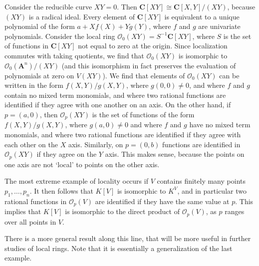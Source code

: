 \begin{example}
    Consider the reducible curve $XY = 0$. Then $\mathbf{C}[XY] \cong \mathbf{C}[X,Y]/(XY)$, because $(XY)$ is a radical ideal. Every element of $\mathbf{C}[XY]$ is equivalent to a unique polynomial of the form $a + Xf(X) + Yg(Y)$, where $f$ and $g$ are univariate polynomials. Consider the local ring $\mathcal{O}_0(XY) = S^{-1}\mathbf{C}[XY]$, where $S$ is the set of functions in $\mathbf{C}[XY]$ not equal to zero at the origin. Since localization commutes with taking quotients, we find that $\mathcal{O}_0(XY)$ is isomorphic to $\mathcal{O}_0(\mathbf{A}^n)/(XY)$ (and this isomorphism in fact preserves the evaluation of polynomials at zero on $V(XY)$). We find that elements of $\mathcal{O}_0(XY)$ can be written in the form $f(X,Y)/g(X,Y)$, where $g(0,0) \neq 0$, and where $f$ and $g$ contain no mixed term monomials, and where two rational functions are identified if they agree with one another on an axis. On the other hand, if $p = (a,0)$, then $\mathcal{O}_p(XY)$ is the set of functions of the form $f(X,Y)/g(X,Y)$, where $g(a,0) \neq 0$ and where $f$ and $g$ have no mixed term monomials, and where two rational functions are identified if they agree with each other on the $X$ axis. Similarly, on $p = (0,b)$ functions are identified in $\mathcal{O}_p(XY)$ if they agree on the $Y$ axis. This makes sense, because the points on one axis are not `local' to points on the other axis.
\end{example}

\begin{example}
    The most extreme example of locality occurs if $V$ contains finitely many points $p_1, \dots, p_n$. It then follows that $K[V]$ is isomorphic to $K^V$, and in particular two rational functions in $\mathcal{O}_p(V)$ are identified if they have the same value at $p$. This implies that $K[V]$ is isomorphic to the direct product of $\mathcal{O}_p(V)$, as $p$ ranges over all points in $V$.
\end{example}

There is a more general result along this line, that will be more useful in further studies of local rings. Note that it is essentially a generalization of the last example.

